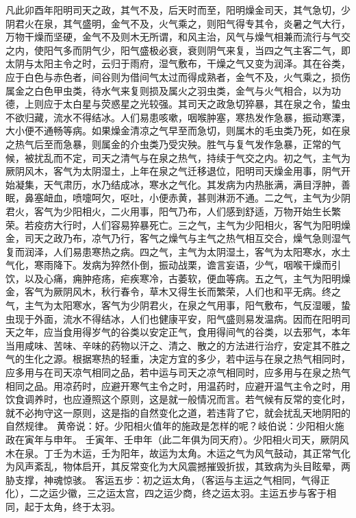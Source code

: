 \documentclass[12pt,UTF8]{ctexbook}
\begin{document}
凡此卯酉年阳明司天之政，其气不及，后天时而至，阳明燥金司天，其气急切，少阴君火在泉，其气盛明，金气不及，火气乘之，则阳气得专其令，炎暑之气大行，万物干燥而坚硬，金气不及则木无所谓，和风主治，风气与燥气相兼而流行与气交之内，使阳气多而阴气少，阳气盛极必衰，衰则阴气来复，当四之气主客二气，即太阴与太阳主令之时，云归于雨府，湿气敷布，干燥之气又变为润泽。其在谷类，应于白色与赤色者，间谷则为借间气太过而得成熟者，金气不及，火气乘之，损伤属金之白色甲虫类，待水气来复则损及属火之羽虫类，金气与火气相合，以为功德，上则应于太白星与荧惑星之光较强。其司天之政急切猝暴，其在泉之令，蛰虫不欲归藏，流水不得结冰。人们易患咳嗽，咽喉肿塞，寒热发作急暴，振动寒溧，大小便不通畅等病。如果燥金清凉之气早至而急切，则属木的毛虫类乃死，如在泉之热气后至而急暴，则属金的介虫类乃受灾殃。胜气与复气发作急暴，正常的气候，被扰乱而不定，司天之清气与在泉之热气，持续于气交之内。初之气，主气为厥阴风木，客气为太阴湿土，上年在泉之气迁移退位，阳明司天燥金用事，阴气开始凝集，天气肃历，水乃结成冰，寒水之气化。其发病为内热胀满，满目浮肿，善眠，鼻塞衄血，喷嚏呵欠，呕吐，小便赤黄，甚则淋沥不通。二之气，主气为少阴君火，客气为少阳相火，二火用事，阳气乃布，人们感到舒适，万物开始生长繁荣。若疫疠大行时，人们容易猝暴死亡。三之气，主气为少阳相火，客气为阳明燥金，司天之政乃布，凉气乃行，客气之燥气与主气之热气相互交合，燥气急则湿气复而润泽，人们易患寒热之病。四之气，主气为太阴湿土，客气为太阳寒水，水土气化，寒雨降下。发病为猝然仆倒，振动战栗，谵言妄语，少气，咽喉干燥而引饮，以及心痛，痈肿疮疡，疟疾寒冷，古萎软，便血等病。五之气，主气为阳明燥金，客气为厥阴风木，秋行春令，草木又得生长而繁荣，人们也和平无病。终之气，主气为太阳寒水，客气为少阴君火，在泉之气用事，阳气敷布，气反湿暖，蛰虫现于外面，流水不得结冰，人们也健康平安，阳气盛则易发温病。因而在阳明司天之年，应当食用得岁气的谷类以安定正气，食用得间气的谷类，以去邪气，本年当用咸味、苦味、辛味的药物以汗之、清之、散之的方法进行治疗，安定其不胜之气的生化之源。根据寒热的轻重，决定方宜的多少，若中运与在泉之热气相同时，应多用与在司天凉气相同之品，若中运与司天之凉气相同时，应多用与在泉之热气相同之品。用凉药时，应避开寒气主令之时，用温药时，应避开温气主令之时，用饮食调养时，也应遵照这个原则，这是就一般情况而言。若气候有反常的变化时，就不必拘守这一原则，这是指的自然变化之道，若违背了它，就会扰乱天地阴阳的自然规律。
黄帝说：好。少阳相火值年的施政是怎样的呢？岐伯说：少阳相火施政在寅年与申年。
壬寅年、壬申年（此二年俱为同天府）。少阳相火司天，厥阴风木在泉。丁壬为木运，壬为阳年，故运为太角。木运之气为风气鼓动，其正常气化为风声紊乱，物体启开，其反常变化为大风震撼摧毁折拔，其致病为头目眩晕，两胁支撑，神魂惊骇。
客运五步：初之运太角，（客运与主运之气相同，气得正化），二之运少徽，三之运太宫，四之运少商，终之运太羽。主运五步与客于相同，起于太角，终于太羽。
\end{document}
